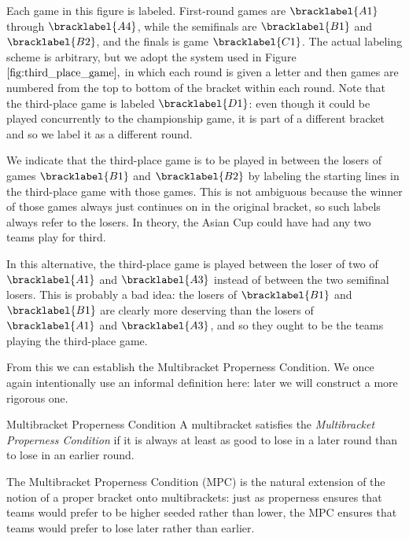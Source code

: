 {    

    Each game in this figure is labeled. First-round games are $\bracklabel{A1}$ through $\bracklabel{A4}$, while the semifinals are $\bracklabel{B1}$ and $\bracklabel{B2}$, and the finals is game $\bracklabel{C1}$. The actual labeling scheme is arbitrary, but we adopt the system used in Figure $\ref{fig:third_place_game},$ in which each round is given a letter and then games are numbered from the top to bottom of the bracket within each round. Note that the third-place game is labeled $\bracklabel{D1}$: even though it could be played concurrently to the championship game, it is part of a different bracket and so we label it as a different round.

    We indicate that the third-place game is to be played in between the losers of games $\bracklabel{B1}$ and $\bracklabel{B2}$ by labeling the starting lines in the third-place game with those games. This is not ambiguous because the winner of those games always just continues on in the original bracket, so such labels always refer to the losers. In theory, the Asian Cup could have had any two teams play for third.


    In this alternative, the third-place game is played between the loser of two of $\bracklabel{A1}$ and $\bracklabel{A3}$ instead of between the two semifinal losers. This is probably a bad idea: the losers of $\bracklabel{B1}$ and $\bracklabel{B1}$ are clearly more deserving than the losers of $\bracklabel{A1}$ and $\bracklabel{A3}$, and so they ought to be the teams playing the third-place game.
    
    From this we can establish the Multibracket Properness Condition. We once again intentionally use an informal definition here: later we will construct a more rigorous one.
    
    \begin{definition}{Multibracket Properness Condition}{} 
        A multibracket satisfies the \textit{Multibracket Properness Condition} if it is always at least as good to lose in a later round than to lose in an earlier round.
    \end{definition}

    The Multibracket Properness Condition (MPC) is the natural extension of the notion of a proper bracket onto multibrackets: just as properness ensures that teams would prefer to be higher seeded rather than lower, the MPC ensures that teams would prefer to lose later rather than earlier.

}
